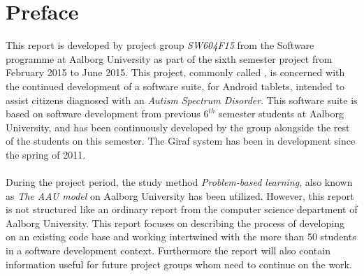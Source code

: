 
\chapter*{Preface}

This report is developed by project group \emph{SW604F15} from the Software programme at Aalborg University as part of the sixth semester project from February 2015 to June 2015. This project, commonly called \giraf, is concerned with the continued development of a software suite, for Android tablets, intended to assist citizens diagnosed with an \emph{Autism Spectrum Disorder}. This software suite is based on software development from previous $6^{th}$ semester students at Aalborg University, and has been continuously developed by the group alongside the rest of the students on this semester. The Giraf system has been in development since the spring of 2011.
\\\\
During the project period, the study method \emph{Problem-based learning}, also known as \emph{The AAU model} on Aalborg University has been utilized. However, this report is not structured like an ordinary report from the computer science department of Aalborg University. This report focuses on describing the process of developing on an existing code base and working intertwined with the more than 50 students in a software development context. Furthermore the report will also contain information useful for future project groups whom need to continue on the work.

